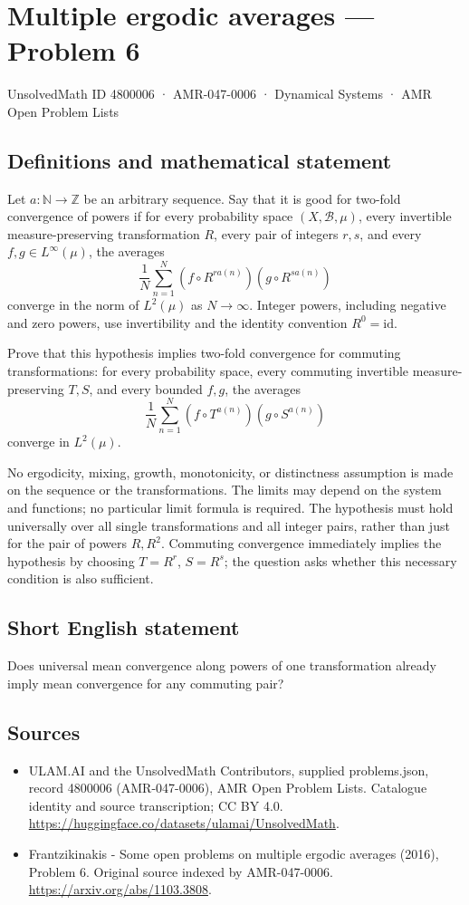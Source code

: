 \documentclass[11pt,a4paper]{article}
\begin{document}
\section*{Multiple ergodic averages — Problem 6}\label{4800006}
{\small UnsolvedMath ID 4800006 · AMR-047-0006 · Dynamical Systems · AMR Open Problem Lists}
\subsection{Definitions and mathematical statement}
Let $a:\mathbb N\to\mathbb Z$ be an arbitrary sequence.
Say that it is good for two-fold convergence of powers
if for every probability space $(X,\mathcal B,\mu)$, every
invertible measure-preserving transformation $R$, every pair
of integers $r,s$, and every $f,g\in L^\infty(\mu)$, the averages
\[
     \frac1N\sum_{n=1}^N
          (f\circ R^{r a(n)})(g\circ R^{s a(n)})
\]
converge in the norm of $L^2(\mu)$ as $N\to\infty$.
Integer powers, including negative and zero powers, use
invertibility and the identity convention $R^0=\mathrm{id}$.

Prove that this hypothesis implies two-fold convergence for
commuting transformations: for every probability space,
every commuting invertible measure-preserving $T,S$, and
every bounded $f,g$, the averages
\[
     \frac1N\sum_{n=1}^N
          (f\circ T^{a(n)})(g\circ S^{a(n)})
\]
converge in $L^2(\mu)$.

No ergodicity, mixing, growth, monotonicity, or distinctness
assumption is made on the sequence or the transformations.
The limits may depend on the system and functions; no
particular limit formula is required. The hypothesis must
hold universally over all single transformations and all
integer pairs, rather than just for the pair of powers
$R,R^2$. Commuting convergence immediately implies the
hypothesis by choosing $T=R^r$, $S=R^s$; the question
asks whether this necessary condition is also sufficient.
\subsection{Short English statement}
Does universal mean convergence along powers of one transformation already imply mean convergence for any commuting pair?
\subsection{Sources}
\begin{itemize}
\item[S1] ULAM.AI and the UnsolvedMath Contributors, supplied problems.json, record 4800006 (AMR-047-0006), AMR Open Problem Lists. Catalogue identity and source transcription; CC BY 4.0.
\url{https://huggingface.co/datasets/ulamai/UnsolvedMath}.
\item[S2] Frantzikinakis - Some open problems on multiple ergodic averages (2016), Problem 6. Original source indexed by AMR-047-0006.
\url{https://arxiv.org/abs/1103.3808}.
\end{itemize}
\end{document}
